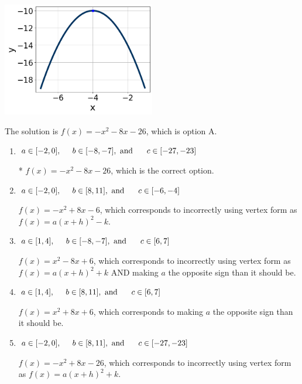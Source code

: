 \documentclass{extbook}[14pt]
\begin{document}
\begin{enumerate}
{\begin{center}
    \includegraphics[width=0.5\textwidth]{../Figures/quadraticGraphToEquationCopyB.png}
\end{center}


The solution is \( f(x) = -x^{2} -8 x -26 \), which is option A.\begin{enumerate}[label=\Alph*.]
\item \( a \in [-2, 0], \hspace*{5mm} b \in [-8, -7], \text{ and } \hspace*{5mm} c \in [-27, -23] \)

* $f(x)=-x^{2} -8 x -26$, which is the correct option.
\item \( a \in [-2, 0], \hspace*{5mm} b \in [8, 11], \text{ and } \hspace*{5mm} c \in [-6, -4] \)

$f(x)=-x^{2} +8 x -6$, which corresponds to incorrectly using vertex form as $f(x) = a(x+h)^2 - k$.
\item \( a \in [1, 4], \hspace*{5mm} b \in [-8, -7], \text{ and } \hspace*{5mm} c \in [6, 7] \)

$f(x)=x^{2} -8 x + 6$, which corresponds to incorrectly using vertex form as $f(x) = a(x+h)^2+k$ AND making $a$ the opposite sign than it should be.
\item \( a \in [1, 4], \hspace*{5mm} b \in [8, 11], \text{ and } \hspace*{5mm} c \in [6, 7] \)

$f(x)=x^{2} +8 x + 6$, which corresponds to making $a$ the opposite sign than it should be.
\item \( a \in [-2, 0], \hspace*{5mm} b \in [8, 11], \text{ and } \hspace*{5mm} c \in [-27, -23] \)

$f(x)=-x^{2} +8 x -26$, which corresponds to incorrectly using vertex form as $f(x) = a(x+h)^2+k$.
\end{enumerate}

}
\end{enumerate}
\end{document}

